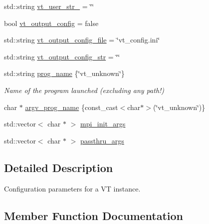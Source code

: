 \begin{DoxyCompactItemize}
\item 
std\+::string \hyperlink{structvt_1_1arguments_1_1_app_config_a98ff430b46d126075db46ef5a9fb9c70}{vt\+\_\+user\+\_\+str\+\_} = \char`\"{}\char`\"{}
\item 
bool \hyperlink{structvt_1_1arguments_1_1_app_config_ac47e68487cbb1f9261f7d025a1f54ffb}{vt\+\_\+output\+\_\+config} = false
\item 
std\+::string \hyperlink{structvt_1_1arguments_1_1_app_config_a803ee6b8dc6ebc7eb0d3a9a603258be7}{vt\+\_\+output\+\_\+config\+\_\+file} = \char`\"{}vt\+\_\+config.\+ini\char`\"{}
\item 
std\+::string \hyperlink{structvt_1_1arguments_1_1_app_config_a1288821490b90f6ff5f07309c6d15379}{vt\+\_\+output\+\_\+config\+\_\+str} = \char`\"{}\char`\"{}
\item 
std\+::string \hyperlink{structvt_1_1arguments_1_1_app_config_ae1c980e81613c029444acf8e5433befd}{prog\+\_\+name} \{\char`\"{}vt\+\_\+unknown\char`\"{}\}
\begin{DoxyCompactList}\small\item\em Name of the program launched (excluding any path!) \end{DoxyCompactList}\item 
char $\ast$ \hyperlink{structvt_1_1arguments_1_1_app_config_a589ec3aa2327f78117c2a5de6bf91cae}{argv\+\_\+prog\+\_\+name} \{const\+\_\+cast$<$char$\ast$$>$(\char`\"{}vt\+\_\+unknown\char`\"{})\}
\item 
std\+::vector$<$ char $\ast$ $>$ \hyperlink{structvt_1_1arguments_1_1_app_config_a617dc1d4e37dfd2490f97011051c1c77}{mpi\+\_\+init\+\_\+args}
\item 
std\+::vector$<$ char $\ast$ $>$ \hyperlink{structvt_1_1arguments_1_1_app_config_a5db80b888a0042e18cca2182a781e178}{passthru\+\_\+args}
\end{DoxyCompactItemize}


\subsection{Detailed Description}
Configuration parameters for a VT instance. 

\subsection{Member Function Documentation}
\mbox{\label{structvt_1_1arguments_1_1_app_config_adea8d58f81c4df7df475ac9f7780decc}} 
